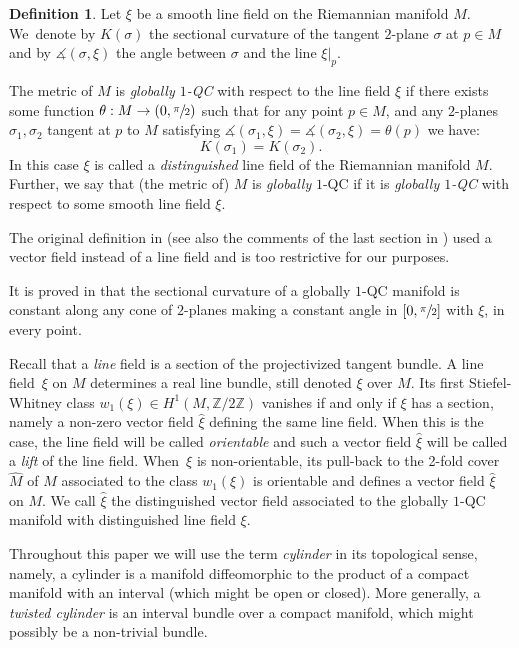 \documentclass[JEP,XML,SOM,Unicode]{cedram}
\theoremstyle{definition}
\newtheorem{definition}[theorem]{Definition}
\theoremstyle{remark}
\numberwithin{equation}{section}
\newcommand{\ZZ}{\mathbb Z}
\begin{document}
\begin{definition}
Let $\xi$ be a smooth line field on the Riemannian manifold $M$.
We~denote by $K(\sigma)$ the sectional curvature
of the tangent $2$\nobreakdash-plane $\sigma$ at $p\in M$ and by
$\measuredangle(\sigma,\xi)$ the angle between $\sigma$ and the line $\xi|_p$.

The metric of $M$ is \emph{globally $1$-QC} with
respect to the line field $\xi$ if there exists some function
$\theta: M\to (0,\sfrac{\pi}{2})$ such that for any
point $p\in M$, and any $2$\nobreakdash-planes $\sigma_1,\sigma_2$ tangent at $p$ to $M$ satisfying
$ \measuredangle(\sigma_1,\xi)=\measuredangle(\sigma_2,\xi)=\theta(p)$
we have:
\[ K(\sigma_1)=K(\sigma_2).\]
In this case $\xi$ is called a \emph{distinguished} line field of the Riemannian manifold $M$.
Further, we say that (the metric of) $M$ is \emph{globally} $1$-QC if it is \emph{globally $1$-QC}
with respect to some smooth line field $\xi$.
\end{definition}

The original definition in \cite{BP,GM} (see also the
comments of the last section in \cite{BP}) used a vector field instead of a line field and is
too restrictive for our purposes.

It is proved in \cite{BP} that the sectional curvature of a globally $1$-QC manifold is constant along any cone of $2$\nobreakdash-planes making a constant angle in $[0,\sfrac{\pi}{2}]$ with $\xi$,
in every point.

Recall that a \emph{line} field is a section of the projectivized tangent bundle.
A line field~$\xi$ on $M$ determines a real line bundle, still denoted $\xi$
over $M$. Its first Stiefel-Whitney class $w_1(\xi)\in H^1(M,\ZZ/2\ZZ)$ vanishes
if and only if $\xi$ has a section, namely a non-zero vector field $\widehat{\xi}$
defining the same line field. When this is the case, the line field will be called \emph{orientable} and such a vector field
$\widehat{\xi}$ will be called a \emph{lift} of the line field.
When~$\xi$ is non-orientable, its pull-back to the 2-fold cover $\widehat{M}$ of $M$ associated to
the class $w_1(\xi)$ is orientable and defines a vector field $\widehat{\xi}$ on $M$.
We call $\widehat{\xi}$ the distinguished vector field associated to the globally $1$-QC manifold
with distinguished line field $\xi$.

Throughout this paper we will use the term \emph{cylinder} in its topological sense,
namely, a cylinder is a manifold diffeomorphic to the product of a compact manifold with an interval (which might be open or closed).
More generally, a \emph{twisted cylinder} is an interval bundle over a compact manifold, which might possibly be a non-trivial bundle.
\end{document}
